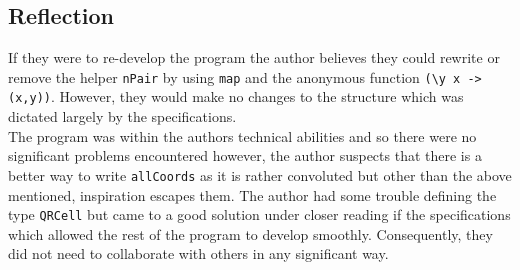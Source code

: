 \documentclass[11pt]{article}
\begin{document}
   \subsection{Reflection}
   If they were to re-develop the program the author believes they could rewrite or remove the helper  \verb|nPair| by using \verb|map| and the anonymous function \verb|(\y x -> (x,y))|. However, they would make no changes to the structure which was dictated largely by the specifications.\\
   
   The program was within the authors technical abilities and so there were no significant problems encountered however, the author suspects that there is a better way to write \verb|allCoords| as it is rather convoluted but other than the above mentioned, inspiration escapes them. The author had some trouble defining the type \verb|QRCell| but came to a good solution under closer reading if the specifications which allowed the rest of the program to develop smoothly. Consequently, they did not need to collaborate with others in any significant way.






\end{document}
